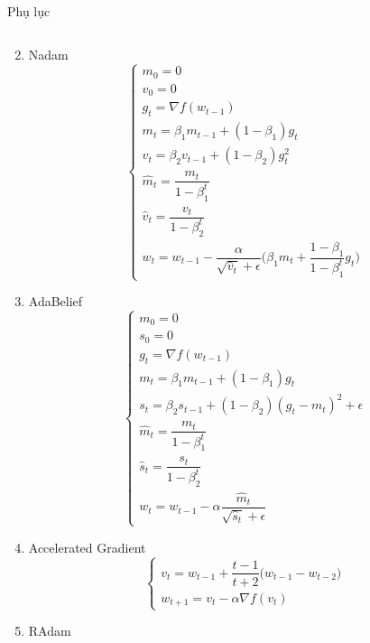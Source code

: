 \documentclass[10pt]{beamer}
\theoremstyle{remark}
\theoremstyle{definition}
\begin{document}
\begin{frame}[allowframebreaks]{Phụ lục}
\begin{enumerate}
\begin{equation*}
		\end{equation*}
		\item Nadam
		\begin{equation*}
			\begin{cases}m_0 = 0\\ v_0 = 0\\ g_t = \nabla f(w_{t-1}) \\ m_t = \beta_1 m_{t-1} + (1-\beta_1) g_t \\ v_t = \beta_2 v_{t-1} + (1-\beta_2)g_t^2 \\
				\hat{m}_t = \dfrac{m_t}{1 - \beta_1^t} \\ \hat{v}_t = \dfrac{v_t}{1 - \beta_2^t} \\ w_t = w_{t-1} -  \dfrac{\alpha}{\sqrt{\hat{v}_t} + \epsilon}\Bigg(\beta_1\hat{m}_t + \dfrac{1-\beta_1}{1-\beta_1^t}g_t\Bigg) \end{cases}
		\end{equation*}
		\item AdaBelief
		\begin{equation*}
			\begin{cases}m_0 = 0\\ s_0 = 0\\ g_t = \nabla f(w_{t-1}) \\ m_t = \beta_1 m_{t-1} + (1-\beta_1) g_t \\ s_t = \beta_2 s_{t-1} + (1-\beta_2)(g_t - m_t)^2 + \epsilon\\
				\hat{m}_t = \dfrac{m_t}{1 - \beta_1^t} \\ \hat{s}_t = \dfrac{s_t}{1 - \beta_2^t} \\ w_t = w_{t-1} - \alpha \dfrac{\hat{m}_t}{\sqrt{\hat{s}_t} + \epsilon} \end{cases}
		\end{equation*}
		\item Accelerated Gradient
		\begin{equation*}
			\begin{cases}v_t = w_{t-1} + \dfrac{t - 1}{t + 2} \big(w_{t-1} - w_{t-2} \big) \\
			w_{t+1} = v_t - \alpha \nabla f(v_t) \end{cases}
		\end{equation*}
		\item RAdam
		\begingroup
\end{enumerate}
\end{frame}
\end{document}

